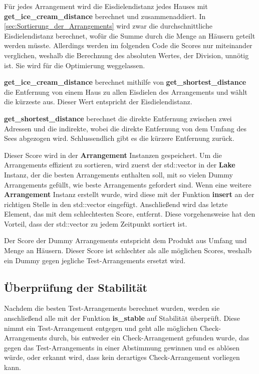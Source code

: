 \documentclass[a4paper,10pt,ngerman,captions=figureheading]{scrartcl}
\begin{document}
Für jedes Arrangement wird die Eisdielendistanz jedes Hauses mit \textbf{get\_ice\_cream\_distance} berechnet und zusammenaddiert.
In \autoref{sec:Sortierung_der_Arrangements} wird zwar die durchschnittliche Eisdielendistanz berechnet, wofür die Summe durch die Menge an Häusern geteilt werden müsste.
Allerdings werden im folgenden Code die Scores nur miteinander verglichen, weshalb die Berechnung des absoluten Wertes, der Division, unnötig ist.
Sie wird für die Optimierung weggelassen.

\medskip
\begin{addmargin}[3em]{4em}
    \textbf{get\_ice\_cream\_distance} berechnet mithilfe von \textbf{get\_shortest\_distance} die Entfernung von einem Haus zu allen Eisdielen des Arrangements und wählt die kürzeste aus.
    Dieser Wert entspricht der Eisdielendistanz.
\end{addmargin}

\medskip
\begin{addmargin}[3em]{4em}
    \textbf{get\_shortest\_distance} berechnet die direkte Entfernung zwischen zwei Adressen und die indirekte, wobei die direkte Entfernung von dem Umfang des Sees abgezogen wird.
    Schlussendlich gibt es die kürzere Entfernung zurück.
\end{addmargin}

\medskip
Dieser Score wird in der \textbf{Arrangement} Instanzen gespeichert.
Um die Arrangements effizient zu sortieren, wird zuerst der std::vector in der \textbf{Lake} Instanz, der die besten Arrangements enthalten soll, mit so vielen Dummy Arrangements gefüllt, wie beste Arrangements gefordert sind.
Wenn eine weitere \textbf{Arrangement} Instanz erstellt wurde, wird diese mit der Funktion \textbf{insert} an der richtigen Stelle in den std::vector eingefügt.
Anschließend wird das letzte Element, das mit dem schlechtesten Score, entfernt.
Diese vorgehensweise hat den Vorteil, dass der std::vector zu jedem Zeitpunkt sortiert ist.

Der Score der Dummy Arrangements entspricht dem Produkt aus Umfang und Menge an Häusern.
Dieser Score ist schlechter als alle möglichen Scores, weshalb ein Dummy gegen jegliche Test-Arrangements ersetzt wird.

\subsection{Überprüfung der Stabilität}
\label{sec:Überprüfung_der_Stabilität}
Nachdem die besten Test-Arrangements berechnet wurden, werden sie anschließend alle mit der Funktion \textbf{is\_stable} auf Stabilität überprüft.
Diese nimmt ein Test-Arrangement entgegen und geht alle möglichen Check-Arrangements durch, bis entweder ein Check-Arrangement gefunden wurde, das gegen das Test-Arrangements in einer Abstimmung gewinnen und es ablösen würde, oder erkannt wird, dass kein derartiges Check-Arrangement vorliegen kann.
\end{document}
